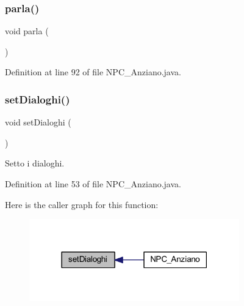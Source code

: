 \subsubsection{\texorpdfstring{parla()}{parla()}}
{\footnotesize\ttfamily void parla (\begin{DoxyParamCaption}{ }\end{DoxyParamCaption})}



Definition at line 92 of file N\+P\+C\+\_\+\+Anziano.\+java.

\mbox{\label{class_entita_1_1_n_p_c___anziano_a63150f067e4d424060ac6d4b46fc0d9b}} 
\subsubsection{\texorpdfstring{set\+Dialoghi()}{setDialoghi()}}
{\footnotesize\ttfamily void set\+Dialoghi (\begin{DoxyParamCaption}{ }\end{DoxyParamCaption})}



Setto i dialoghi. 



Definition at line 53 of file N\+P\+C\+\_\+\+Anziano.\+java.

Here is the caller graph for this function\+:
\nopagebreak
\begin{figure}[H]
\begin{center}
\leavevmode
\includegraphics[width=258pt]{class_entita_1_1_n_p_c___anziano_a63150f067e4d424060ac6d4b46fc0d9b_icgraph}
\end{center}
\end{figure}
\mbox{\label{class_entita_1_1_n_p_c___anziano_a447f807a76b7ea97a78cb76241fe8bc8}} 
